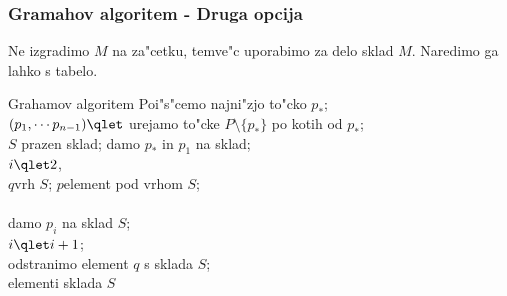 \documentclass{beamer}
\begin{document}
\begin{frame}
	\frametitle{Gramahov algoritem - Druga opcija}
	Ne izgradimo $M$ na za"cetku, temve"c uporabimo za delo sklad $M$. Naredimo ga lahko s tabelo.\\
	\medskip
	\begin{algorithm}{Grahamov algoritem}{}
		Poi"s"cemo najni"zjo to"cko $p_*$;\\
		$(p_1,\dotsm p_{n-1})\qlet$ urejamo to"cke $P\setminus \{p_*\}$  po kotih od $p_*$;\\
		$S$ prazen sklad; damo $p_*$ in $p_1$ na sklad;\\
		$i\qlet 2$,
		\\
			$q$\qlet vrh $S$; $p$\qlet element pod vrhom $S$;\\
			 \\
				damo $p_i$ na sklad $S$; \\
				$i\qlet i+1$;\\
			\qelse odstranimo element $q$ s sklada $S$;
			\qfi
		\qelihw\\
		\qreturn elementi sklada $S$
	\end{algorithm}
\end{frame}
\end{document}
